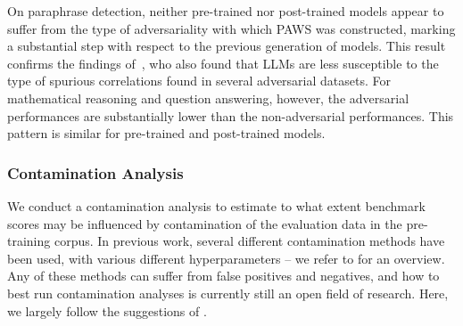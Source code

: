 On paraphrase detection, neither pre-trained nor post-trained models appear to suffer from the type of adversariality with which PAWS was constructed, marking a substantial step with respect to the previous generation of models.
This result confirms the findings of~\citet{weber-etal-2023-mind}, who also found that LLMs are less susceptible to the type of spurious correlations found in several adversarial datasets.
For mathematical reasoning and question answering, however, the adversarial performances are substantially lower than the non-adversarial performances.
This pattern is similar for pre-trained and post-trained models.

\subsubsection{Contamination Analysis}
\label{subsec:contamination_analysis}

We conduct a contamination analysis to estimate to what extent benchmark scores may be influenced by contamination of the evaluation data in the pre-training corpus.
In previous work, several different contamination methods have been used, with various different hyperparameters -- we refer to \citet{singh2024contamination} for an overview.
Any of these methods can suffer from false positives and negatives, and how to best run contamination analyses is currently still an open field of research.
Here, we largely follow the suggestions of \citet{singh2024contamination}.


